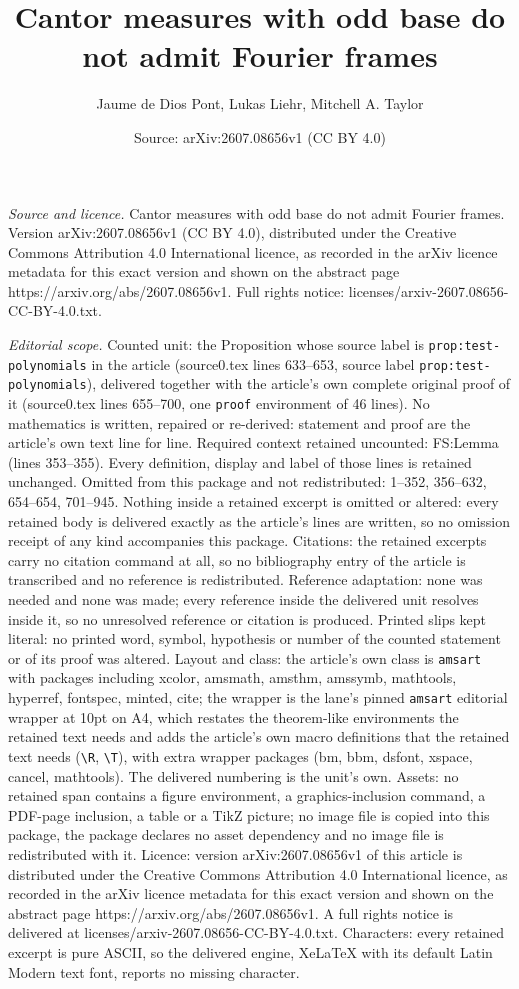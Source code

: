 \documentclass[10pt,a4paper]{amsart}
\title[Cantor measures with odd base do not admit Fourier frames]{Cantor measures with odd base do not admit Fourier frames}
\author{Jaume de Dios Pont, Lukas Liehr, Mitchell A. Taylor}
\date{Source: arXiv:2607.08656v1 (CC BY 4.0)}
\begin{document}
\maketitle

\noindent\emph{Source and licence.} Cantor measures with odd base do not admit Fourier frames. Version arXiv:2607.08656v1 (CC BY 4.0), distributed under the Creative Commons Attribution 4.0 International licence, as recorded in the arXiv licence metadata for this exact version and shown on the abstract page https://arxiv.org/abs/2607.08656v1. Full rights notice: licenses/arxiv-2607.08656-CC-BY-4.0.txt.\par\smallskip

\noindent\textit{Editorial scope.} Counted unit: the Proposition whose source label is \texttt{prop:test-polynomials} in the article (source0.tex lines 633--653, source label \texttt{prop:test-polynomials}), delivered together with the article's own complete original proof of it (source0.tex lines 655--700, one \texttt{proof} environment of 46 lines). No mathematics is written, repaired or re-derived: statement and proof are the article's own text line for line. Required context retained uncounted: FS:Lemma (lines 353--355). Every definition, display and label of those lines is retained unchanged. Omitted from this package and not redistributed: 1--352, 356--632, 654--654, 701--945. Nothing inside a retained excerpt is omitted or altered: every retained body is delivered exactly as the article's lines are written, so no omission receipt of any kind accompanies this package. Citations: the retained excerpts carry no citation command at all, so no bibliography entry of the article is transcribed and no reference is redistributed. Reference adaptation: none was needed and none was made; every reference inside the delivered unit resolves inside it, so no unresolved reference or citation is produced. Printed slips kept literal: no printed word, symbol, hypothesis or number of the counted statement or of its proof was altered. Layout and class: the article's own class is \texttt{amsart} with packages including xcolor, amsmath, amsthm, amssymb, mathtools, hyperref, fontspec, minted, cite; the wrapper is the lane's pinned \texttt{amsart} editorial wrapper at 10pt on A4, which restates the theorem-like environments the retained text needs and adds the article's own macro definitions that the retained text needs (\texttt{\textbackslash R}, \texttt{\textbackslash T}), with extra wrapper packages (bm, bbm, dsfont, xspace, cancel, mathtools). The delivered numbering is the unit's own. Assets: no retained span contains a figure environment, a graphics-inclusion command, a PDF-page inclusion, a table or a TikZ picture; no image file is copied into this package, the package declares no asset dependency and no image file is redistributed with it. Licence: version arXiv:2607.08656v1 of this article is distributed under the Creative Commons Attribution 4.0 International licence, as recorded in the arXiv licence metadata for this exact version and shown on the abstract page https://arxiv.org/abs/2607.08656v1. A full rights notice is delivered at licenses/arxiv-2607.08656-CC-BY-4.0.txt. Characters: every retained excerpt is pure ASCII, so the delivered engine, XeLaTeX with its default Latin Modern text font, reports no missing character.
\end{document}
